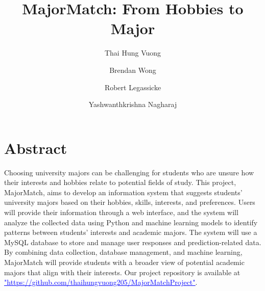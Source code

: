 \documentclass[sigconf]{acmart}
\begin{document}

\title{MajorMatch: From Hobbies to Major}


\author{Thai Hung Vuong}

\author{Brendan Wong}

\author{Robert Legassicke}

\author{Yashwanthkrishna Nagharaj}


\maketitle


\section{Abstract}
Choosing university majors can be challenging for students who are unsure how their interests and hobbies relate to potential fields of study. This project, MajorMatch, aims to develop an information system that suggests students' university majors based on their hobbies, skills, interests, and preferences. Users will provide their information through a web interface, and the system will analyze the collected data using Python and machine learning models to identify patterns between students' interests and academic majors. The system will use a MySQL database to store and manage user responses and prediction-related data. By combining data collection, database management, and machine learning, MajorMatch will provide students with a broader view of potential academic majors that align with their interests. Our project repository is available at
\href{https://github.com/thaihungvuong205/MajorMatchProject.git}
{\textcolor{blue}{\underline{"https://github.com/thaihungvuong205/MajorMatchProject"}}}.
\end{document}

